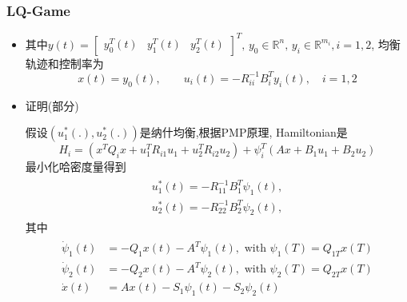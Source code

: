 \documentclass[UTF8, aspectratio=169, 9pt]{ctexbeamer}
\begin{document}
\begin{frame}
\frametitle{LQ-Game}
\begin{itemize}
\item
  其中$y(t) = \begin{bmatrix} y^T_0(t) & y^T_1(t) & y^T_2(t) \end{bmatrix}^T, \, y_0 \in \mathbb{R}^n, \, y_i \in \mathbb{R}^{m_i}, i=1,2$, 均衡轨迹和控制率为
  $$
  x(t) = y_0(t), \qquad u_i(t) = - R^{-1}_{ii} B^T_i y_i(t), \quad i=1,2
  $$

  \item 证明(部分)

  假设$(u^*_1(.), u^*_2(.))$是纳什均衡,根据PMP原理, Hamiltonian是
  $$
  H_i = (x^T Q_i x + u^T_1 R_{i1} u_1 + u^T_2 R_{i2} u_2) + \psi^T_i (Ax + B_1 u_1 + B_2 u_2)
  $$
  最小化哈密度量得到
  \begin{align*}
    \begin{split}
      u^*_1 (t) = - R^{-1}_{11} B^T_1 \psi_1 (t), \\
      u^*_2 (t) = - R^{-1}_{22} B^T_2 \psi_2 (t),
    \end{split}
  \end{align*}
  其中
    \begin{align*}
    \begin{split}
    \dot{\psi}_{1}(t) &=-Q_{1} x(t)-A^{T} \psi_{1}(t), \text { with } \psi_{1}(T)=Q_{1 T} x(T) \\
    \dot{\psi}_{2}(t) &=-Q_{2} x(t)-A^{T} \psi_{2}(t), \text { with } \psi_{2}(T)=Q_{2 T} x(T) \\
    \dot{x}(t) &= A x(t) - S_1 \psi_1 (t) - S_2 \psi_2 (t)
    \end{split}
  \end{align*}
\end{itemize}
\end{frame}
\end{document}
